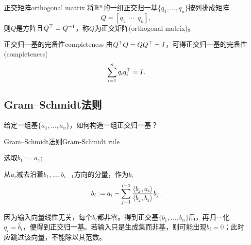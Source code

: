 \begin{definition}
	{正交矩阵}{orthogonal matrix}
	将$\mathbb{R}^n$的一组正交归一基$\{q_1,\ldots,q_n\}$按列排成矩阵
	\[
		Q = [q_1\enspace\cdots\enspace q_n],
	\]
	则$Q$是方阵且$Q^\top = Q^{-1}$，称$Q$为正交矩阵(orthogonal matrix)。
\end{definition}
\begin{theorem}
	{正交归一基的完备性}{completeness}
	由$Q^\top Q = QQ^\top = I$，可得正交归一基的完备性(completeness)
	\begin{equation}
		\sum_{i=1}^nq_iq_i^\top = I.
	\end{equation}
\end{theorem}

\subsection{Gram--Schmidt法则}

给定一组基$\{a_1,\ldots,a_n\}$，如何构造一组正交归一基？

\begin{method}{Gram--Schmidt法则}{Gram-Schmidt rule}
	\begin{compactenum}
		\item 选取$b_1 := a_1;$
		\item 从$a_i$减去沿着$b_1,\ldots,b_{i-1}$方向的分量，作为$b_i$
		\begin{equation}\label{eq:la-gram-schmidt}
			b_i := a_i - \sum_{j=1}^{i-1}\frac{\langle b_j,a_i\rangle}{\langle b_j,b_j\rangle}b_j.
		\end{equation}
	\end{compactenum}
	因为输入向量线性无关，每个$b_i$都非零。得到正交基$\{b_1,\ldots,b_n\}$后，再归一化$q_i = \hat b_i$，便得到正交归一基。若输入只是生成集而非基，则可能出现$b_i = 0$；此时应跳过该向量，不能除以其范数。
\end{method}


